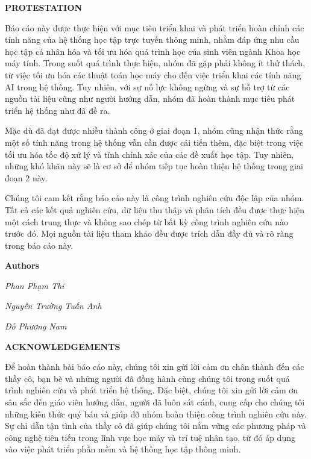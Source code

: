 \documentclass[12pt,a4paper]{report}
\theoremstyle{definition}
\begin{document}
\newpage
\begin{center}
	\textbf{\Large PROTESTATION} \par
\end{center}
Báo cáo này được thực hiện với mục tiêu triển khai và phát triển hoàn chỉnh các tính năng của hệ thống học tập trực tuyến thông minh, nhằm đáp ứng nhu cầu học tập cá nhân hóa và tối ưu hóa quá trình học của sinh viên ngành Khoa học máy tính. Trong suốt quá trình thực hiện, nhóm đã gặp phải không ít thử thách, từ việc tối ưu hóa các thuật toán học máy cho đến việc triển khai các tính năng AI trong hệ thống. Tuy nhiên, với sự nỗ lực không ngừng và sự hỗ trợ từ các nguồn tài liệu cũng như người hướng dẫn, nhóm đã hoàn thành mục tiêu phát triển hệ thống như đã đề ra.

Mặc dù đã đạt được nhiều thành công ở giai đoạn 1, nhóm cũng nhận thức rằng một số tính năng trong hệ thống vẫn cần được cải tiến thêm, đặc biệt trong việc tối ưu hóa tốc độ xử lý và tính chính xác của các đề xuất học tập. Tuy nhiên, những khó khăn này sẽ là cơ sở để nhóm tiếp tục hoàn thiện hệ thống trong giai đoạn 2 này.

Chúng tôi cam kết rằng báo cáo này là công trình nghiên cứu độc lập của nhóm. Tất cả các kết quả nghiên cứu, dữ liệu thu thập và phân tích đều được thực hiện một cách trung thực và không sao chép từ bất kỳ công trình nghiên cứu nào trước đó. Mọi nguồn tài liệu tham khảo đều được trích dẫn đầy đủ và rõ ràng trong báo cáo này.
\par\hfill\textbf{Authors}\hspace{1cm}

\par\hfill\textit{Phan Phạm Thi}\hspace{0.3cm}
\par\hfill\textit{Nguyễn Trường Tuấn Anh}\hspace{0.2cm}\par\hfill\textit{Đỗ Phương Nam}
\newpage

\begin{center}
	\textbf{\Large ACKNOWLEDGEMENTS} \par
\end{center}
Để hoàn thành bài báo cáo này, chúng tôi xin gửi lời cảm ơn chân thành đến các thầy cô, bạn bè và những người đã đồng hành cùng chúng tôi trong suốt quá trình nghiên cứu và phát triển hệ thống. Đặc biệt, chúng tôi xin gửi lời cảm ơn sâu sắc đến giáo viên hướng dẫn, người đã luôn sát cánh, cung cấp cho chúng tôi những kiến thức quý báu và giúp đỡ nhóm hoàn thiện công trình nghiên cứu này. Sự chỉ dẫn tận tình của thầy cô đã giúp chúng tôi nắm vững các phương pháp và công nghệ tiên tiến trong lĩnh vực học máy và trí tuệ nhân tạo, từ đó áp dụng vào việc phát triển phần mềm và hệ thống học tập thông minh.
\end{document}
